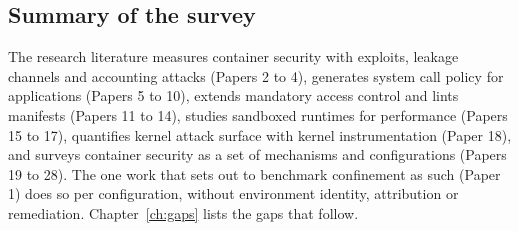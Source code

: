 \subsection{Summary of the survey}
The research literature measures container security with exploits, leakage channels and accounting attacks (Papers 2 to 4), generates system call policy for applications (Papers 5 to 10), extends mandatory access control and lints manifests (Papers 11 to 14), studies sandboxed runtimes for performance (Papers 15 to 17), quantifies kernel attack surface with kernel instrumentation (Paper 18), and surveys container security as a set of mechanisms and configurations (Papers 19 to 28). The one work that sets out to benchmark confinement as such (Paper 1) does so per configuration, without environment identity, attribution or remediation. Chapter~\ref{ch:gaps} lists the gaps that follow.
